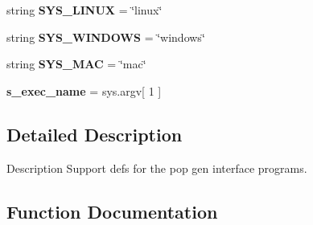 \begin{DoxyCompactItemize}
\item 
string {\bfseries S\+Y\+S\+\_\+\+L\+I\+N\+UX} = \char`\"{}linux\char`\"{}\hypertarget{namespacenegui_1_1pgutilities_aeccb8b0b17c7d891838cba42245af21f}{}\label{namespacenegui_1_1pgutilities_aeccb8b0b17c7d891838cba42245af21f}

\item 
string {\bfseries S\+Y\+S\+\_\+\+W\+I\+N\+D\+O\+WS} = \char`\"{}windows\char`\"{}\hypertarget{namespacenegui_1_1pgutilities_a1b63e58ac56fd9c130d038961d9d3f99}{}\label{namespacenegui_1_1pgutilities_a1b63e58ac56fd9c130d038961d9d3f99}

\item 
string {\bfseries S\+Y\+S\+\_\+\+M\+AC} = \char`\"{}mac\char`\"{}\hypertarget{namespacenegui_1_1pgutilities_a7013b038174112cd25916bc2b4e9736d}{}\label{namespacenegui_1_1pgutilities_a7013b038174112cd25916bc2b4e9736d}

\item 
{\bfseries s\+\_\+exec\+\_\+name} = sys.\+argv\mbox{[} 1 \mbox{]}\hypertarget{namespacenegui_1_1pgutilities_a25b185def2c6bb2698b1927b4a20a904}{}\label{namespacenegui_1_1pgutilities_a25b185def2c6bb2698b1927b4a20a904}

\end{DoxyCompactItemize}


\subsection{Detailed Description}
\begin{DoxyVerb}Description
Support defs for the pop gen interface programs.
\end{DoxyVerb}
 

\subsection{Function Documentation}

